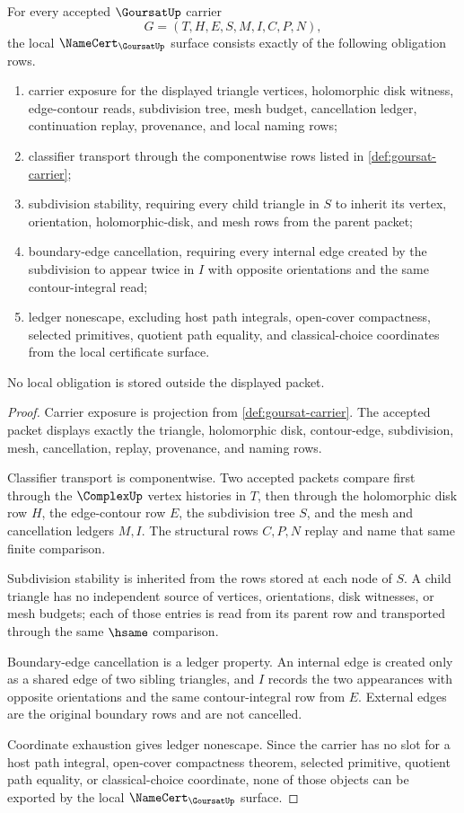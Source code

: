 \begin{theorem}
\label{thm:goursat-namecert-obligations}
For every accepted $\GoursatUp$ carrier
$$
G=(T,H,E,S,M,I,C,P,N),
$$
the local $\NameCert_{\GoursatUp}$ surface consists exactly of the following obligation rows.
\begin{enumerate}
\item carrier exposure for the displayed triangle vertices, holomorphic disk witness, edge-contour reads, subdivision tree, mesh budget, cancellation ledger, continuation replay, provenance, and local naming rows;
\item classifier transport through the componentwise rows listed in \autoref{def:goursat-carrier};
\item subdivision stability, requiring every child triangle in $S$ to inherit its vertex, orientation, holomorphic-disk, and mesh rows from the parent packet;
\item boundary-edge cancellation, requiring every internal edge created by the subdivision to appear twice in $I$ with opposite orientations and the same contour-integral read;
\item ledger nonescape, excluding host path integrals, open-cover compactness, selected primitives, quotient path equality, and classical-choice coordinates from the local certificate surface.
\end{enumerate}
No local obligation is stored outside the displayed packet.
\end{theorem}
\begin{proof}
Carrier exposure is projection from \autoref{def:goursat-carrier}. The accepted packet displays exactly the triangle, holomorphic disk, contour-edge, subdivision, mesh, cancellation, replay, provenance, and naming rows.

Classifier transport is componentwise. Two accepted packets compare first through the $\ComplexUp$ vertex histories in $T$, then through the holomorphic disk row $H$, the edge-contour row $E$, the subdivision tree $S$, and the mesh and cancellation ledgers $M,I$. The structural rows $C,P,N$ replay and name that same finite comparison.

Subdivision stability is inherited from the rows stored at each node of $S$. A child triangle has no independent source of vertices, orientations, disk witnesses, or mesh budgets; each of those entries is read from its parent row and transported through the same $\hsame$ comparison.

Boundary-edge cancellation is a ledger property. An internal edge is created only as a shared edge of two sibling triangles, and $I$ records the two appearances with opposite orientations and the same contour-integral row from $E$. External edges are the original boundary rows and are not cancelled.

Coordinate exhaustion gives ledger nonescape. Since the carrier has no slot for a host path integral, open-cover compactness theorem, selected primitive, quotient path equality, or classical-choice coordinate, none of those objects can be exported by the local $\NameCert_{\GoursatUp}$ surface.
\end{proof}

